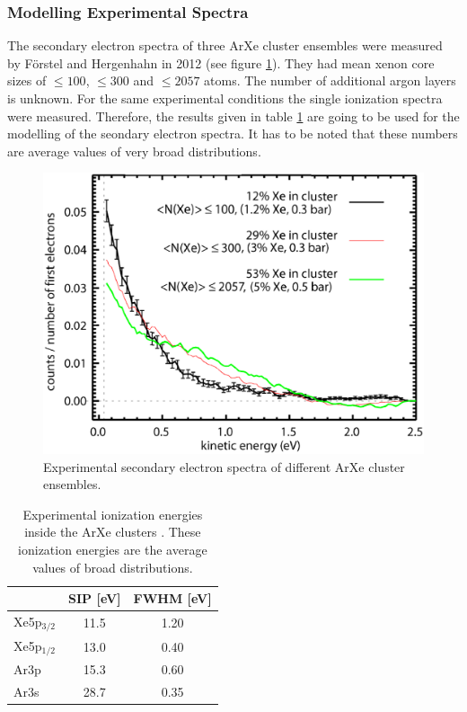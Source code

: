 \subsubsection{Modelling Experimental Spectra}

The secondary electron spectra of three ArXe cluster ensembles were measured by
Förstel and Hergenhahn in 2012 (see figure \ref{figure:arxe_exp}).
They had mean xenon core sizes
of $\le100$, $\le300$ and $\le2057$ atoms. The number of additional argon
layers is unknown.
For the same experimental conditions the single ionization spectra were
measured. Therefore, the results given in table \ref{table:exp_arxe_ionization}
are going to be used for the modelling of the seondary electron spectra.
It has to be noted that these numbers are average values of very broad
distributions.

\begin{figure}
 \centering
 \includegraphics[scale=0.5]{pics/arxe_cluster_exp_groessenvergleich.eps}
 \caption{Experimental secondary electron spectra of different ArXe
          cluster ensembles.}
 \label{figure:arxe_exp}
\end{figure}

\begin{table}
 \centering
 \caption{Experimental ionization energies inside the ArXe clusters
          \cite{Foerstel_private}. These ionization energies are the
          average values of broad distributions.}
 \begin{tabular}{lcc}
  \toprule
             & SIP [eV]  & FWHM [eV] \\
  \midrule
   Xe5p$_{3/2}$ & 11.5   & 1.20 \\
   Xe5p$_{1/2}$ & 13.0   & 0.40 \\
   Ar3p         & 15.3   & 0.60 \\
   Ar3s         & 28.7   & 0.35 \\
  \bottomrule
 \end{tabular}
 \label{table:exp_arxe_ionization}
\end{table}

